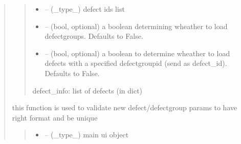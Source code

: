 \documentclass[letterpaper,10pt,english]{sphinxmanual}
\begin{document}
\begin{quote}
\begin{savenotes}
\begin{fulllineitems}
\begin{quote}
\begin{description}
\begin{itemize}
\item {} 
\sphinxAtStartPar
{} – (\_type\_) defect ids list

\item {} 
\sphinxAtStartPar
{} – (bool, optional) a boolean determining wheather to load defect\sphinxhyphen{}groups. Defaults to False.

\item {} 
\sphinxAtStartPar
{} – (bool, optional) a boolean to determine wheather to load defects with a specified defect\sphinxhyphen{}group\sphinxhyphen{}id (send as defect\_id). Defaults to False.

\end{itemize}

\sphinxAtStartPar
defect\_info: list of defects (in dict)

\end{description}\end{quote}

\end{fulllineitems}\end{savenotes}


\begin{savenotes}\begin{fulllineitems}
\label{\detokenize{setting/backend/defect_management_funcs:oxin.backend.defect_management_funcs.new_defect_info_validation}}
\pysigstartsignatures
{}
\pysigstopsignatures
\sphinxAtStartPar
this function is used to validate new defect/defect\sphinxhyphen{}group params to have right format and be unique
\begin{quote}\begin{description}
\begin{itemize}
\item {} 
\sphinxAtStartPar
{} – (\_type\_) main ui object


\end{itemize}
\end{description}
\end{quote}
\end{fulllineitems}
\end{savenotes}
\end{quote}
\end{document}
